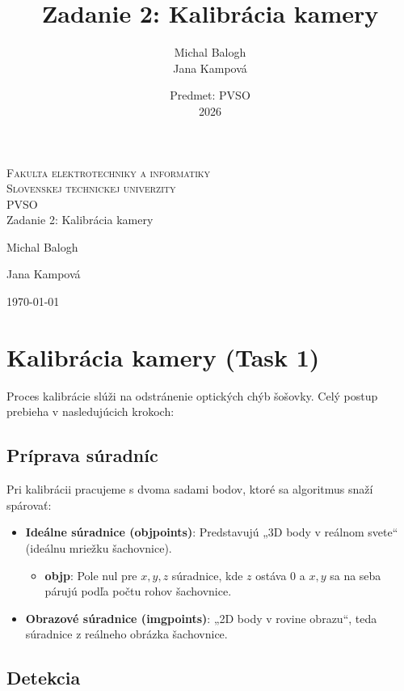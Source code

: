 \documentclass[a4paper, 12pt]{article}
\title{Zadanie 2: Kalibrácia kamery}
\author{Michal Balogh \\ Jana Kampová}
\date{Predmet: PVSO \\ 2026}
\begin{document}
\begin{titlepage}
	\begin{center}
		\textsc{
			\Huge{Fakulta elektrotechniky a informatiky\\
                  Slovenskej technickej univerzity\\}
		}
		\LARGE{
            \Large{PVSO}\\
			\Huge{Zadanie 2: Kalibrácia kamery}\\
		}
	\end{center}
	{\Large{
		\hfill
		Michal Balogh

        \hfill
        Jana Kampová

        \today
		}
	}
\end{titlepage}
\clearpage
\tableofcontents
\clearpage
\section{Kalibrácia kamery (Task 1)}

Proces kalibrácie slúži na odstránenie optických chýb šošovky. Celý postup prebieha v nasledujúcich krokoch:

\subsection{Príprava súradníc}
Pri kalibrácii pracujeme s dvoma sadami bodov, ktoré sa algoritmus snaží spárovať:

\begin{itemize}
    \item \textbf{Ideálne súradnice (\textbf{objpoints})}: Predstavujú „3D body v reálnom svete“ (ideálnu mriežku šachovnice).
    \begin{itemize}
        \item \textbf{\textbf{objp}}: Pole nul pre $x, y, z$ súradnice, kde $z$ ostáva 0 a $x, y$ sa na seba párujú podľa počtu rohov šachovnice.
    \end{itemize}
    \item \textbf{Obrazové súradnice (\textbf{imgpoints})}: „2D body v rovine obrazu“, teda súradnice z reálneho obrázka šachovnice.
\end{itemize}

\subsection{Detekcia}
\end{document}
